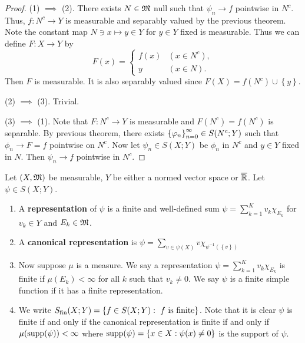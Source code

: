 \documentclass[a4paper]{article}
\begin{document}
\begin{proof}
  
(1) $\implies$ (2). There exists $N \in \mathfrak{M}$ null such that 
$\psi_n \to f$ pointwise in $N^c$. Thus, 
$f: N^c \to Y$ is measurable and separably valued
by the previous theorem. Note the constant map 
$N \ni x \mapsto y \in Y$ for $y \in Y$ fixed is measurable. 
Thus we can define $F : X \to Y$ by 
\[
F(x) = \begin{cases}
  f(x) & (x \in N^c), \\
  y & (x \in N).
\end{cases}
\]
Then $F$ is measurable. It is also separably valued 
since $F(X) = f(N^c) \cup \left\{ y \right\}$.

(2) $\implies$ (3). Trivial.

(3) $\implies$ (1). Note that $F: N^c \to Y$ is measurable
and $F(N^c) = f(N^c)$ is separable.
By previous theorem, there exists $\left\{ \varphi_n \right\}_{n=0}^\infty \in S(N^c; 
Y)$ such that $\phi_n \to F = f$ 
pointwise on $N^c$.
Now let $\psi_n \in S(X; Y)$ be $\phi_n$ in $N^c$ 
and $y \in Y$ fixed in $N$. Then $\psi_n \to f$ pointwise
in $N^c$.

\end{proof}

\begin{defi}
  
Let $(X, \mathfrak{M})$ be measurable, $Y$ be either a normed vector
space or $\overline{\mathbb{R}}$. Let $\psi \in S(X; Y)$.
\begin{enumerate}
  \item A \textbf{representation} of $\psi$ is a finite and 
  well-defined sum 
  $\psi = \sum_{k=1}^K v_k \chi_{E_k}$ 
  for $v_k \in Y$ and $E_k \in \mathfrak{M}$.
  
  \item A \textbf{canonical representation} is 
  $\psi = \sum_{v \in \psi(X)} v \chi_{\psi^{-1}
  (\left\{ v \right\})}$
  \item Now suppose $\mu$ is a measure.
  We say a representation $\psi = \sum_{k=1}^K 
  v_k \chi_{E_k}$ is finite if $\mu(E_k) < \infty$
  for all $k$ such that $v_k \neq 0$. We 
  say $\psi$ is a finite simple function if it has a 
  finite representation.
  
  \item We write $S_{\text{fin}}(X; Y) = \left\{ 
    f \in S(X; Y) : \text{ $f$ is finite}
   \right\}$.
  Note that it is clear $\psi$ is finite if and only if 
  the canonical representation is finite if and only if 
  $\mu(\operatorname{supp}(\psi)) < \infty$ where 
  $\operatorname{supp}(\psi) = \left\{ x \in X : \psi(x) \neq 0 \right\}$
  is the support of $\psi$.
\end{enumerate}

\end{defi}
\end{document}
